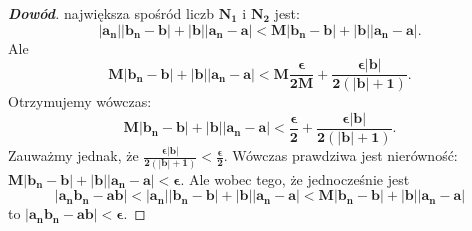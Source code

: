 \begin{proof}[\textbf{Dowód}]
największa spośród liczb $\boldsymbol{N_{1}}$ i $\boldsymbol{N_{2}}$ jest: 
\[
\boldsymbol{\left |a_{n}\right|\left |b_{n}-b\right|+\left |b\right|\left |a_{n}-a\right|< M\left |b_{n}-b\right|+\left |b\right|\left |a_{n}-a\right|}.
\] 
Ale \[\boldsymbol{M\left |b_{n}-b\right|+\left |b\right|\left |a_{n}-a\right|< M\frac{\epsilon}{2M}+\frac{\epsilon\left |b \right|}{2\left (\left |b \right|+1 \right)}}.
\] 
Otrzymujemy wówczas: \[\boldsymbol{M\left |b_{n}-b \right|+ \left |b \right|\left |a_{n}-a \right|<\frac{\epsilon}{2}+\frac{\epsilon\left |b \right|}{2\left (\left |b \right|+1 \right)}}.
\] 
Zauważmy jednak, że $\boldsymbol{\frac{\epsilon\left |b \right|}{2\left (\left |b \right|+1 \right)}<\frac{\epsilon}{2}}$. 
Wówczas prawdziwa jest nierówność: $\boldsymbol{M\left |b_{n}-b \right|+\left |b \right|\left |a_{n}-a \right|<\epsilon}$. 
Ale wobec tego, że jednocześnie jest \[
\boldsymbol{\left |a_{n}b_{n}-ab \right|<\left |a_{n} \right|\left | b_{n}-b\right|+\left |b \right|\left |a_{n}-a \right|< M\left |b_{n}-b \right|+\left |b \right|\left |a_{n}-a \right|} 
\] 
to $\boldsymbol{\left |a_{n}b_{n}-ab \right|<\epsilon}$.
\end{proof}
